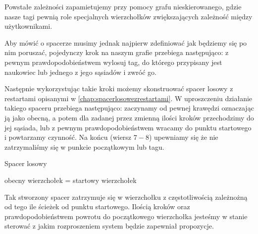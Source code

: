 Powstałe zależności zapamietujemy przy pomocy grafu nieskierowanego, gdzie nasze tagi pewnią role specjalnych wierzchołków zwiększających zależność między użytkownikami. 

Aby mówić o spacerze musimy jednak najpierw zdefiniować jak będziemy się po nim poruszać, pojedynczy krok na naszym grafie przebiega następująco: z pewnym prawdopodobieństwem wylosuj tag, do którego przypisany jest naukowiec lub jednego z jego sąsiadów i zwróć go.

\begin{pseudokod}
\DontPrintSemicolon
{}
\end{pseudokod}

Następnie wykorzystując takie kroki możemy skonstruować spacer losowy z restartami opisanymi w \ref{chap:spacerlosowezrestartami}. W uproszczeniu działanie takiego spaceru przebiega następująco: zaczynamy od pewnej krawędzi oznaczając ją jako obecną, a potem dla zadanej przez zmienną ilości kroków przechodzimy do jej sąsiada, lub z pewnym prawdopodobieństwem wracamy do punktu startowego i powtarzamy czynność. Na końcu (wiersz $7-8$) upewniamy się że nie zatrzymaliśmy się w punkcie początkowym lub tagu.

\begin{pseudokod}[H]
\DontPrintSemicolon
\caption{Spacer losowy}
obecny wierzchołek = startowy wierzchołek\;

\end{pseudokod}

Tak stworzony spacer zatrzymuje się w wierzchołku z częstotliwością zależnożną od tego ile ścieżek od punktu startowego. Ilością kroków oraz prawdopodobieństwem powrotu do początkowego wierzchołka jesteśmy w stanie sterować z jakim rozproszeniem system będzie zapewniał propozycje.


